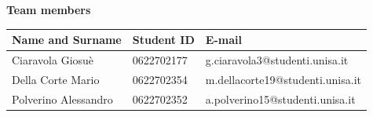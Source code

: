 \begin{titlepage}
    \vspace{12mm} %
    
    \begin{center}
        \textbf{Team members}\\
        \vspace{2mm}
        \begin{tabular}{|p{4.5cm}|p{2.5cm}|p{6cm}|}
            \hline
            \bf Name and Surname& \bf Student ID& \bf E-mail\\
            \hline
            Ciaravola Giosuè& 0622702177& g.ciaravola3@studenti.unisa.it\\ \hline 
            Della Corte Mario& 0622702354& m.dellacorte19@studenti.unisa.it\\ \hline
            Polverino Alessandro& 0622702352& a.polverino15@studenti.unisa.it\\ \hline 
        \end{tabular}
    \end{center}
    
    \vspace{12mm}
    

\end{titlepage}